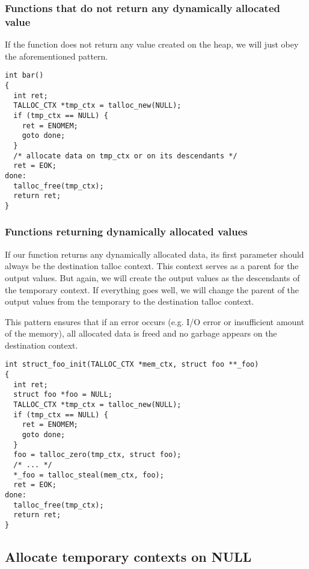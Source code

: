 \subsubsection{Functions that do not return any dynamically allocated value}

If the function does not return any value created on the heap, we will just obey
the aforementioned pattern.

\begin{lstlisting}[caption={Temporary context \#1},label=lst:tmp-ctx-1]
int bar()
{
  int ret;
  TALLOC_CTX *tmp_ctx = talloc_new(NULL);
  if (tmp_ctx == NULL) {
    ret = ENOMEM;
    goto done;
  }
  /* allocate data on tmp_ctx or on its descendants */
  ret = EOK;
done:
  talloc_free(tmp_ctx);
  return ret;
}
\end{lstlisting}

\subsubsection{Functions returning dynamically allocated values}

If our function returns any dynamically allocated data, its first parameter
should always be the destination talloc context. This context serves as a parent
for the output values. But again, we will create the output values as the
descendants of the temporary context. If everything goes well, we will change
the parent of the output values from the temporary to the destination talloc
context.

This pattern ensures that if an error occurs (e.g. I/O error or insufficient
amount of the memory), all allocated data is freed and no garbage appears on
the destination context.

\begin{lstlisting}[caption={Temporary context \#2},label=lst:tmp-ctx-2]
int struct_foo_init(TALLOC_CTX *mem_ctx, struct foo **_foo)
{
  int ret;
  struct foo *foo = NULL;
  TALLOC_CTX *tmp_ctx = talloc_new(NULL);
  if (tmp_ctx == NULL) {
    ret = ENOMEM;
    goto done;
  }
  foo = talloc_zero(tmp_ctx, struct foo);
  /* ... */
  *_foo = talloc_steal(mem_ctx, foo);
  ret = EOK;
done:
  talloc_free(tmp_ctx);
  return ret;
}
\end{lstlisting}

\subsection{Allocate temporary contexts on NULL}
\label{talloc:subsec:tmp-ctx-on-null}

